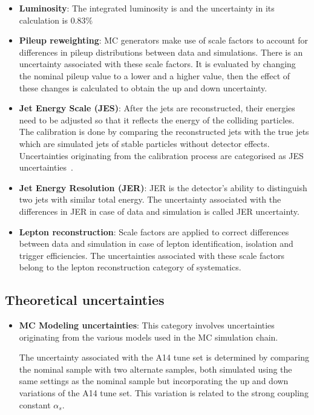 \begin{itemize}
  \item \textbf{Luminosity}: The integrated luminosity is \lumi and the uncertainty in its calculation
  is $0.83\%$

  \item \textbf{Pileup reweighting}: MC generators make use of scale factors to account for differences in 
  pileup distributions between data and simulations. There is an uncertainty associated with these 
  scale factors. It is evaluated by changing the nominal pileup value to a lower and a higher value,
  then the effect of these changes is calculated to obtain the up and down uncertainty.

  \item \textbf{Jet Energy Scale (JES)}: After the jets are reconstructed, their energies need to be 
  adjusted so that it reflects the energy of the colliding particles. The calibration is done by 
  comparing the reconstructed jets with the true jets which are simulated jets of stable particles 
  without detector effects. Uncertainties originating from the calibration process are categorised 
  as JES uncertainties~\cite{Barillari2012}.

  \item \textbf{Jet Energy Resolution (JER)}: JER is the detector's ability to distinguish two jets 
  with similar total energy. The uncertainty associated with the differences in JER in case of data and 
  simulation is called JER uncertainty. 

  \item \textbf{Lepton reconstruction}: Scale factors are applied to correct differences between data and
  simulation in case of lepton identification, isolation and trigger efficiencies. The uncertainties
  associated with these scale factors belong to the lepton reconstruction category of systematics.  

\end{itemize}

\subsection{Theoretical uncertainties}

\begin{itemize}
  \item \textbf{MC Modeling uncertainties}: This category involves uncertainties originating from the 
  various models used in the MC simulation chain. 

  The uncertainty associated with the A14 tune set is determined by comparing the nominal sample with 
  two alternate samples, both simulated using the same settings as the nominal sample but incorporating 
  the up and down variations of the A14 tune set. This variation is related to the strong 
  coupling constant $\alpha_s$.


\end{itemize}
\label{sec:systdescribe2}


